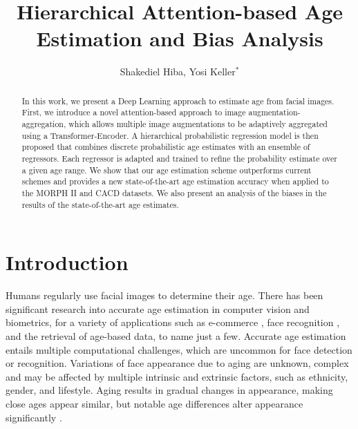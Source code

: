 \documentclass[10pt,journal]{IEEEtran}\usepackage{amsfonts}
\begin{document}
\title{Hierarchical Attention-based Age Estimation and Bias Analysis}
\author{Shakediel Hiba, Yosi Keller$^{\ast}$
}
\maketitle

\begin{abstract}
In this work, we present a Deep Learning approach to estimate age from facial
images. First, we introduce a novel attention-based approach to image
augmentation-aggregation, which allows multiple image augmentations to be
adaptively aggregated using a Transformer-Encoder. A hierarchical
probabilistic regression model is then proposed that combines discrete
probabilistic age estimates with an ensemble of regressors. Each regressor is
adapted and trained to refine the probability estimate over a given age range.
We show that our age estimation scheme outperforms current schemes and
provides a new state-of-the-art age estimation accuracy when applied to the
MORPH II and CACD datasets. We also present an analysis of the biases in the
results of the state-of-the-art age estimates.

\end{abstract}

\section{Introduction}

\label{sec:introduction}

Humans regularly use facial images to determine their age. There has been
significant research into accurate age estimation in computer vision and
biometrics, for a variety of applications such as e-commerce
\cite{Hakeem2012VideoAF}, face recognition \cite{Lanitis2004ComparingDC}, and the
retrieval of age-based data, to name just a few. Accurate age estimation
entails multiple computational challenges, which are uncommon for face detection or
recognition. Variations of face appearance due to aging are unknown, complex
and may be affected by multiple intrinsic and extrinsic factors, such as
ethnicity, gender, and lifestyle. Aging results in gradual changes in
appearance, making close ages appear similar, but notable age differences
alter appearance significantly \cite{Facial_Aging}.
\end{document}
